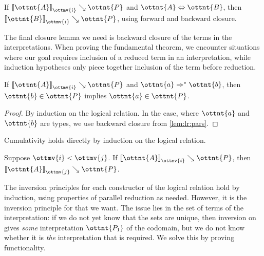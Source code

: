 \documentclass[a4paper,UKenglish,cleveref,autoref,thm-restate]{lipics-v2021}
\begin{document}
\begin{corollary}[Conversion (l.r.)]
  If $ \mathopen{\llbracket}  \ottnt{A}  \mathclose{\rrbracket}_{ \ottmv{i} } \searrow  \ottnt{P} $ and $ \ottnt{A}  \Leftrightarrow  \ottnt{B} $,
  then $ \mathopen{\llbracket}  \ottnt{B}  \mathclose{\rrbracket}_{ \ottmv{i} } \searrow  \ottnt{P} $,
  using forward and backward closure.
\end{corollary}

The final closure lemma we need is backward closure of the terms in the interpretations.
When proving the fundamental theorem,
we encounter situations where our goal requires inclusion of a reduced term in an interpretation,
while induction hypotheses only piece together inclusion of the term before reduction.

\begin{lemma}
  If $ \mathopen{\llbracket}  \ottnt{A}  \mathclose{\rrbracket}_{ \ottmv{i} } \searrow  \ottnt{P} $ and $ \ottnt{a}  \Rightarrow^\ast  \ottnt{b} $,
  then $ \ottnt{b}  \in  \ottnt{P} $ implies $ \ottnt{a}  \in  \ottnt{P} $.
\end{lemma}

\begin{proof}
  By induction on the logical relation.
  In the  case, where $\ottnt{a}$ and $\ottnt{b}$ are types,
  we use backward closure from \cref{lem:lr:pars}.
\end{proof}

Cumulativity holds directly by induction on the logical relation.

\begin{lemma}[Cumulativity (l.r.)] \label{lem:lr:cumul}
  Suppose $ \ottmv{i}  <  \ottmv{j} $. If $ \mathopen{\llbracket}  \ottnt{A}  \mathclose{\rrbracket}_{ \ottmv{i} } \searrow  \ottnt{P} $, then $ \mathopen{\llbracket}  \ottnt{A}  \mathclose{\rrbracket}_{ \ottmv{j} } \searrow  \ottnt{P} $.
\end{lemma}

The inversion principles for each constructor of the logical relation
hold by induction, using properties of parallel reduction as needed.
However, it is the inversion principle for  that we want.
The issue lies in the set of terms of the interpretation:
if we do not yet know that the sets are unique,
then inversion on  gives \emph{some} interpretation $\ottnt{P_{{\mathrm{1}}}}$ of the codomain,
but we do not know whether it is \emph{the} interpretation that is required.
We solve this by proving functionality.
\end{document}
